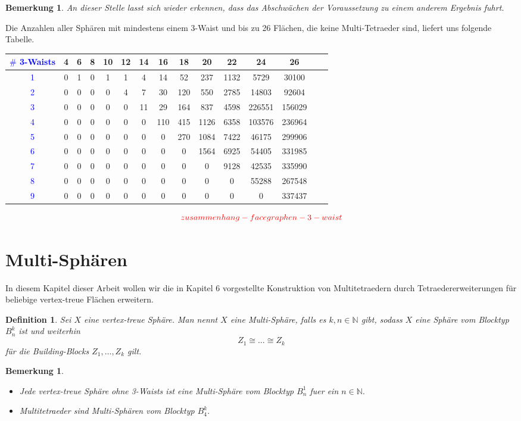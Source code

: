 \documentclass[12pt,titlepage,twoside,cleardoublepage]{article}
\theoremstyle{nummermitklammern}
\newtheorem{definition}[temp]{Definition}
\newtheorem{bemerkung}[temp]{Bemerkung}
\newtheorem{definition}[zahl]{Definition}
\newtheorem{bemerkung}[zahl]{Bemerkung}
\numberwithin{equation}{section}
\begin{document}
\begin{bemerkung}
An dieser Stelle lasst sich wieder erkennen, dass das Abschwächen
der Voraussetzung zu einem anderem Ergebnis fuhrt.
\end{bemerkung}
Die Anzahlen aller Sphären mit mindestens einem 3-Waist und bis zu 26 Flächen,
die keine Multi-Tetraeder sind, liefert uns folgende Tabelle.
\begin{center}
\begin{tabular}{|c|c|c|c|c|c|c|c|c|c|c|c|c|c|c|}
\hline
\textcolor{blue}{$\#$ 3-Waists }&\textbf{4}& \textbf{6}& \textbf{8}& \textbf{10}& \textbf{12}& \textbf{14}& \textbf{16}& \textbf{18}& \textbf{20}& \textbf{22}& \textbf{24}& \textbf{26}\\
\hline
\textcolor{blue}{1} &0& 1& 0& 1& 1& 4& 14& 52& 237& 1132& 5729& 30100\\
\hline
\textcolor{blue}{2} &0& 0& 0 &0& 4& 7& 30& 120& 550& 2785& 14803& 92604\\
\hline
\textcolor{blue}{3}& 0& 0& 0& 0& 0& 11& 29& 164& 837& 4598& 226551& 156029\\
\hline
\textcolor{blue}{4}& 0& 0& 0& 0& 0& 0& 110& 415& 1126& 6358& 103576& 236964\\
\hline
\textcolor{blue}{5}& 0& 0& 0& 0& 0& 0& 0& 270& 1084& 7422& 46175& 299906\\
\hline
\textcolor{blue}{6} &0& 0& 0& 0& 0& 0& 0& 0 &1564& 6925& 54405& 331985\\
\hline
\textcolor{blue}{7}& 0& 0& 0& 0& 0& 0& 0& 0& 0& 9128& 42535& 335990\\
\hline
\textcolor{blue}{8}& 0& 0& 0& 0& 0& 0& 0& 0& 0& 0& 55288& 267548\\
\hline
\textcolor{blue}{9} &0& 0& 0& 0& 0& 0& 0& 0& 0& 0& 0& 337437\\
\hline
\end{tabular}
\end{center}
\[
\textcolor{red}{zusammenhang-facegraphen-3-waist }
\]
\section{Multi-Sphären}
In diesem Kapitel dieser Arbeit wollen wir die in Kapitel 6 vorgestellte Konstruktion von Multitetraedern durch Tetraedererweiterungen für beliebige vertex-treue Flächen erweitern.   
\begin{definition}
Sei $X$ eine vertex-treue Sphäre. Man nennt $X$ eine \emph{Multi-Sphäre}, falls es $k,n \in \mathbb{N}$ gibt, sodass $X$ eine Sphäre vom Blocktyp $B_n^k$ ist und weiterhin
\[
Z_1\cong \ldots\cong Z_k
\]
für die Building-Blocks $Z_1,\ldots,Z_k$ gilt. 
\end{definition}
\begin{bemerkung}
\begin{itemize}
\item Jede vertex-treue Sphäre ohne 3-Waists ist eine Multi-Sphäre vom Blocktyp $B_n^1$ fuer ein $n\in \mathbb{N}.$
\item Multitetraeder sind Multi-Sphären vom Blocktyp $B_4^k.$
\end{itemize}
\end{bemerkung}
\end{document}
